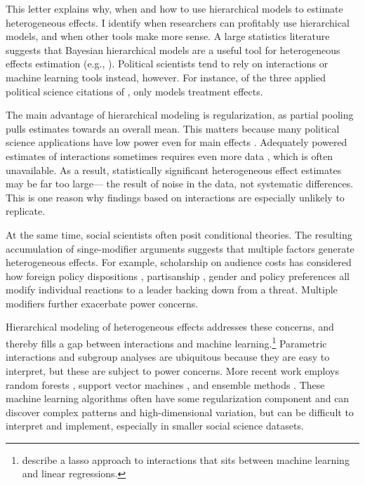 \documentclass[12pt]{article}
\begin{document}
This letter explains why, when and how to use hierarchical models to estimate heterogeneous effects. 
I identify when researchers can profitably use hierarchical models, and when other tools make more sense. 
A large statistics literature suggests that Bayesian hierarchical models are a useful tool for  heterogeneous effects estimation (e.g., \cite{FellerGelman2015, McElreath2016, Dorieetal2022}).
Political scientists tend to rely on interactions or machine learning tools instead, however.  
For instance, of the three applied political science citations of \citet{FellerGelman2015}, only \citet{Marquardt2022} models treatment effects. 


The main advantage of hierarchical modeling is regularization, as partial pooling pulls estimates towards an overall mean. 
This matters because many political science applications have low power even for main effects \citep{ArelBundocketal2022}.
Adequately powered estimates of interactions sometimes requires even more data \citep{Gelman2018}, which is often unavailable.
As a result, statistically significant heterogeneous effect estimates may be far too large--- the result of noise in the data, not systematic differences. 
This is one reason why findings based on interactions are especially unlikely to replicate\citep{Simmonsetal2011}. 


At the same time, social scientists often posit conditional theories.
The resulting accumulation of singe-modifier arguments suggests that multiple factors generate heterogeneous effects.
For example, scholarship on audience costs has considered how foreign policy dispositions \citep{KertzerBrutger2016}, partisanship \citep{LevenduskyHorowitz2012}, gender \citep{Barnhartetal2020, SchwartzBlair2020} and policy preferences \citep{Chaudoin2014} all modify individual reactions to a leader backing down from a threat.
Multiple modifiers further exacerbate power concerns.  


Hierarchical modeling of heterogeneous effects addresses these concerns, and thereby fills a gap between interactions and machine learning.\footnote{\citet{BlackwellOlson2022} describe a lasso approach to interactions that sits between machine learning and linear regressions.}
Parametric interactions and subgroup analyses are ubiquitous because they are easy to interpret, but these are subject to power concerns. 
More recent work employs random forests \citep{GreenKern2012, WagerAthey2018}, support vector machines \citep{ImaiRatkovic2013}, and ensemble methods \citep{Grimmeretal2017, Kuenzeletal2019, Dorieetal2022}.
These machine learning algorithms often have some regularization component and can discover complex patterns and high-dimensional variation, but can be difficult to interpret and implement, especially in smaller social science datasets.
\end{document}
